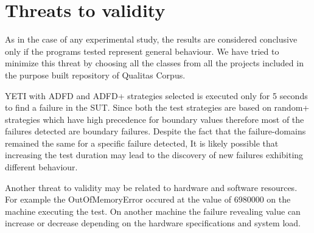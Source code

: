 \documentclass[runningheads,a4paper]{llncs}
\begin{document}



\section{Threats to validity} \label{sec:threat}
As in the case of any experimental study, the results are considered conclusive only if the programs tested represent general behaviour. We have tried to minimize this threat by choosing all the classes from all the projects included in the purpose built repository of Qualitas Corpus. 

YETI with ADFD and ADFD+ strategies selected is executed only for 5 seconds to find a failure in the SUT. Since both the test strategies are based on random+ strategies which have high precedence for boundary values therefore most of the failures detected are boundary failures. Despite the fact that the failure-domains remained the same for a specific failure detected, It is likely possible that increasing the test duration may lead to the discovery of new failures exhibiting different behaviour.

Another threat to validity may be related to hardware and software resources. For example the OutOfMemoryError occured at the value of 6980000 on the machine executing the test. On another machine the failure revealing value can increase or decrease depending on the hardware specifications and system load.










\end{document}
